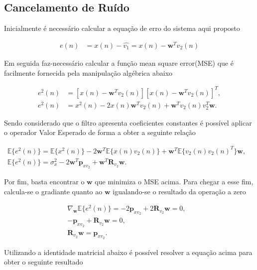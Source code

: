 \subsection{Cancelamento de Ruído}

Inicialmente é necessário calcular a equação de erro do sistema aqui proposto

\begin{align}
    e(n) &= x(n) - \hat{v_{1}} = x(n) - \mathbf{w}^{T}v_{2}(n)
\end{align}

Em seguida faz-necessário calcular a função mean square error(MSE) que é facilmente fornecida pela manipulação algébrica abaixo

\begin{align}
    e^{2}(n) &= [x(n) - \mathbf{w}^{T}v_{2}(n)][x(n) - \mathbf{w}^{T}v_{2}(n)]^{T}, \\
    e^{2}(n) &= x^{2}(n) - 2x(n)\mathbf{w}^{T}v_{2}(n) + \mathbf{w}^{T}v_{2}(n)v_{2}^{T}\mathbf{w}.
\end{align}

Sendo considerado que o filtro apresenta coeficientes constantes é possível aplicar o operador Valor Esperado de forma a obter a seguinte relação

\begin{align}
    \mathbb{E}\{e^{2}(n)\} = \mathbb{E}\{x^{2}(n)\} - 2\mathbf{w}^{T}\mathbb{E}\{x(n) v_{2}(n)\} + \mathbf{w}^{T}\mathbb{E}\{v_{2}(n)v_{2}(n)^{T}\} \mathbf{w},& \\
    \mathbb{E}\{e^{2}(n)\} = \sigma^{2}_{x} - 2\mathbf{w}^{T}\mathbf{p}_{xv_{2}} + \mathbf{w}^{T}\mathbf{R}_{v_{2}} \mathbf{w}.&
\end{align}

Por fim, basta encontrar o $\mathbf{w}$ que minimiza o MSE acima. Para chegar a esse fim, calcula-se o gradiante quanto ao $\mathbf{w}$ igualando-se o resultado da operação a zero

\begin{align}
    \nabla_{\mathbf{w}} \mathbb{E}\{e^{2}(n)\} = - 2\mathbf{p}_{xv_{2}} + 2\mathbf{R}_{v_{2}} \mathbf{w} = 0,& \\
    -\mathbf{p}_{xv_{2}} + \mathbf{R}_{v_{2}} \mathbf{w} = 0,& \\
    \mathbf{R}_{v_{2}} \mathbf{w} = \mathbf{p}_{xv_{2}}.&
\end{align}

Utilizando a identidade matricial abaixo é possível resolver a equação acima para obter o seguinte resultado

